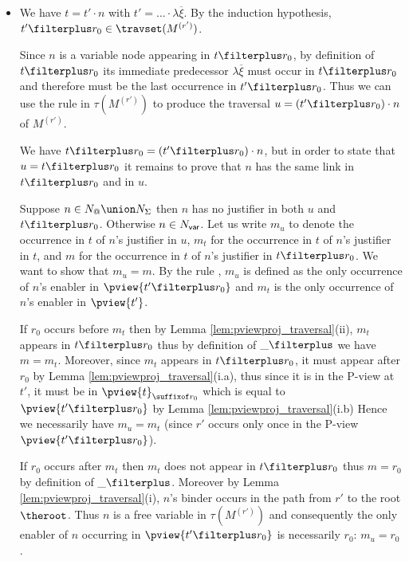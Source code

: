     \begin{itemize}
    \item {}
        We have  $t = t' \cdot n$ with $t' = \ldots \cdot \lambda \overline{\xi}$. By the induction hypothesis, $t' \filterplus r_0 \in  \travset(M^{(r')})$.

        Since $n$ is a variable node appearing in $t\filterplus r_0$, by definition of $t\filterplus r_0$ its immediate predecessor
        $\lambda \overline{\xi}$ must occur in $t\filterplus r_0$ and therefore must be the last occurrence in $t'\filterplus r_0$. Thus we can use the rule  in $\tau(M^{(r')})$ to produce the traversal $u = (t'\filterplus r_0) \cdot n$ of $M^{(r')}$.

        We have $t \filterplus r_0 = (t'\filterplus r_0) \cdot n$, but in order to state that $u = t \filterplus r_0$ it remains to prove that $n$ has the same link in $t \filterplus r_0$ and in $u$.

        Suppose $n \in N_@ \union N_\Sigma$ then $n$ has no justifier in both $u$ and $t\filterplus r_0$. Otherwise $n \in N_{\sf var}$. Let us write $m_u$ to denote the occurrence in $t$ of $n$'s justifier in $u$, $m_t$ for the occurrence in $t$ of $n$'s justifier in $t$, and $m$ for the occurrence in $t$ of $n$'s justifier in $t \filterplus r_0$. We want to show that $m_u = m$.
        By the rule , $m_u$ is defined as the only occurrence of $n$'s enabler in $\pview{t'\filterplus r_0}$ and $m_t$ is the only occurrence of $n$'s enabler in $\pview{t'}$.

        If $r_0$ occurs before $m_t$ then by Lemma \ref{lem:pviewproj_traversal}(ii), $m_t$ appears in $t \filterplus r_0$ thus by definition of $\_ \filterplus$ we have $m = m_t$. Moreover, since $m_t$ appears in $t\filterplus r_0$, it must appear
        after $r_0$ by Lemma \ref{lem:pviewproj_traversal}(i.a), thus since it is in the P-view at $t'$, it must be
        in $\pview{t}_{\suffixof r_0}$ which is equal to $\pview{t'\filterplus r_0}$ by Lemma \ref{lem:pviewproj_traversal}(i.b)
        Hence we necessarily have $m_u = m_t$ (since $r'$ occurs only once in the P-view $\pview{t'\filterplus r_0}$).

        If $r_0$ occurs after $m_t$ then $m_t$ does not appear in $t\filterplus r_0$ thus $m = r_0$ by definition of $\_ \filterplus$. Moreover by Lemma \ref{lem:pviewproj_traversal}(i), $n$'s binder occurs in the path from $r'$ to the root $\theroot$. Thus $n$ is a free variable in $\tau(M^{(r')})$ and consequently the only enabler of $n$ occurring in $\pview{t'\filterplus r_0}$ is necessarily $r_0$: $m_u = r_0$.


\end{itemize}
